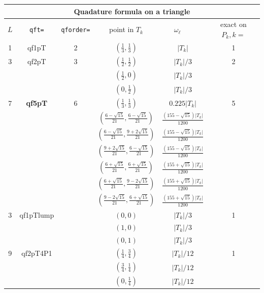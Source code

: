 \documentclass[a4paper,twoside,12pt]{book}
\begin{document}
\begin{center}
\begin{tabular}{|c|c|c|c|c|c|}
    \hline
      \multicolumn{6}{|c|}{ Quadature formula on a triangle}\\
     \hline
    $L$ & \texttt{qft=} & \texttt{qforder=} &
    point in $T_k$ & $\omega_\ell$~~~  & exact on $P_k, k=$ \\
    \hline
    \hline
    1 & qf1pT&2&$\left(\frac{1}{3},\frac{1}{3}\right)$ & $|T_k|$ & 1 \\
    \hline
    3 & qf2pT&3& $\left(\frac{1}{2},\frac{1}{2}\right)$ & $|T_k|/3$ & 2 \\
    & &&$\left(\frac{1}{2},0\right)$ & $|T_k|/3$ &  \\
    & &&$\left(0,\frac{1}{2}\right)$ & $|T_k|/3$ &  \\
    \hline
    7 & \textbf{qf5pT}&6&$\left(\frac{1}{3},\frac{1}{3}\right)$ & $0.225|T_k|$ & 5 \\
    & & & $\left(\frac{6-\sqrt{15}}{21},\frac{6-\sqrt{15}}{21}\right)$ & $
    \frac{(155-\sqrt{15})|T_k|}{1200}$ & \\
    & & & $\left(\frac{6-\sqrt{15}}{21},\frac{9+2\sqrt{15}}{21}\right)$ & $\frac{(155-\sqrt{15})|T_k|}{1200}$ &\\
    & & & $\left(\frac{9+2\sqrt{15}}{21},\frac{6-\sqrt{15}}{21}\right)$ & $\frac{(155-\sqrt{15})|T_k|}{1200}$ &\\
    & & & $\left(\frac{6+\sqrt{15}}{21},\frac{6+\sqrt{15}}{21}\right)$ & $\frac{(155+\sqrt{15})|T_k|}{1200}$ &\\
    & & & $\left(\frac{6+\sqrt{15}}{21},\frac{9-2\sqrt{15}}{21}\right)$ & $\frac{(155+\sqrt{15})|T_k|}{1200}$ &\\
    & & & $\left(\frac{9-2\sqrt{15}}{21},\frac{6+\sqrt{15}}{21}\right)$ & $\frac{(155+\sqrt{15})|T_k|}{1200}$ &\\
    \hline
    3 & qf1pTlump& & $\left(0,0\right)$ & $|T_k|/3$ & 1 \\
    & &&$\left(1,0\right)$ & $|T_k|/3$ &  \\
    & &&$\left(0,1\right)$ & $|T_k|/3$ &  \\
    \hline
    9 & qf2pT4P1& &$\left(\frac{1}{4},\frac{3}{4}\right)$ & $|T_k|/12$ & 1  \\
      &         & &$\left(\frac{3}{4},\frac{1}{4}\right)$ & $|T_k|/12$ &   \\
      &         & &$\left(0,\frac{1}{4}\right)$ & $|T_k|/12$ &   \\

\end{tabular}
\end{center}
\end{document}
